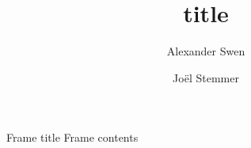 \documentclass{beamer}
\begin{document}
\title{title}
\author{Alexander Swen \and Jo\"el Stemmer}
\date{}

\begin{frame}
\titlepage
\end{frame}

\begin{frame}{Frame title}
Frame contents
\end{frame}
\end{document}
